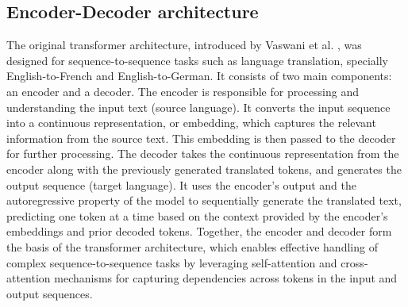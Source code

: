 \documentclass[anon,12pt]{colt2024} %
\begin{document}
\subsection{Encoder-Decoder architecture}
The original transformer architecture, introduced by Vaswani et al. \cite{vaswani2017attention}, was designed for sequence-to-sequence tasks such as language translation, specially English-to-French and English-to-German.
It consists of two main components: an encoder and a decoder.
The encoder is responsible for processing and understanding the input text (source language). It converts the input sequence into a continuous representation, or embedding, which captures the relevant information from the source text. This embedding is then passed to the decoder for further processing.
The decoder takes the continuous representation from the encoder along with the previously generated translated tokens, and generates the output sequence (target language). It uses the encoder's output and the autoregressive property of the model to sequentially generate the translated text, predicting one token at a time based on the context provided by the encoder's embeddings and prior decoded tokens.
Together, the encoder and decoder form the basis of the transformer architecture, which enables effective handling of complex sequence-to-sequence tasks by leveraging self-attention and cross-attention mechanisms for capturing dependencies across tokens in the input and output sequences.


\end{document}
